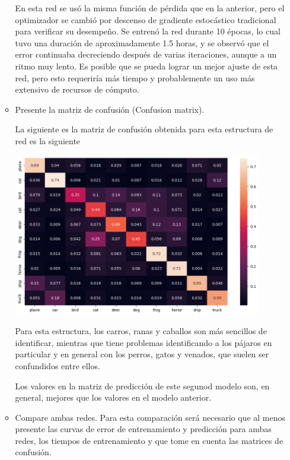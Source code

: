 \documentclass{article}
\begin{document}
\begin{enumerate}
\begin{itemize}
    En esta red se usó la misma función de pérdida que en la anterior, pero el 
    optimizador se cambió por descenso de gradiente estocástico tradicional para
    verificar su desempeño. Se entrenó la red durante 10 épocas, lo cual tuvo una
    duración de aproximadamente 1.5 horas, y se observó que el error continuaba 
    decreciendo después de varias iteraciones, aunque a un ritmo muy lento. Es posible
    que se pueda lograr un mejor ajuste de esta red, pero esto requeriría más tiempo
    y probablemente un uso más extensivo de recursos de cómputo.

        \item Presente la matriz de confusión (Confusion matrix).
        
        La siguiente es la matriz de confusión obtenida para esta estructura de red es
        la siguiente 
        \begin{center}
            \includegraphics[width=0.9\textwidth]{./Tarea11/cm4.png}
        \end{center}

        Para esta estructura, los carros, ranas y caballos son más sencillos de identificar,
        mientras que tiene problemas identificando a los pájaros en particular y en general
        con los perros, gatos y venados, que suelen ser confundidos entre ellos.

        Los valores en la matriz de predicción de este segunod modelo son, en general,
        mejores que los valores en el modelo anterior.

        \item Compare ambas redes. Para esta comparación será necesario que al 
        menos presente las curvas de error de entrenamiento y predicción para 
        ambas redes, los tiempos de entrenamiento y que tome en cuenta las 
        matrices de confusión.


\end{itemize}
\end{enumerate}
\end{document}
